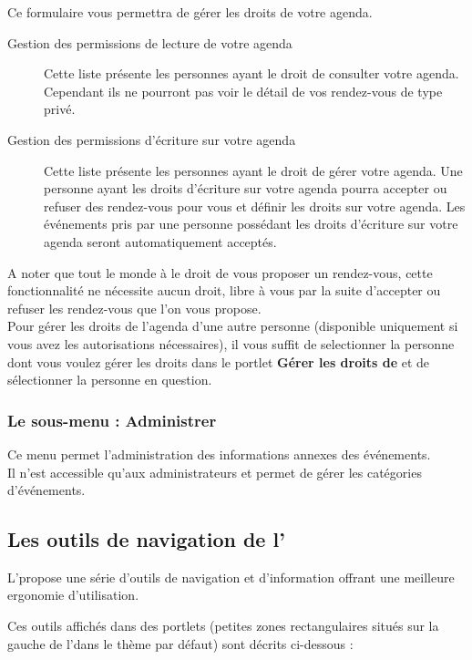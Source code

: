 Ce formulaire vous permettra de gérer les droits de votre agenda.
\begin{description}
\item[Gestion des permissions de lecture de votre agenda] Cette liste présente
les personnes ayant le droit de consulter votre agenda. Cependant ils ne
pourront pas voir le détail de vos rendez-vous de type privé.
\item[Gestion des permissions d'écriture sur votre agenda] Cette liste présente
les personnes ayant le droit de gérer votre agenda. Une personne ayant les
droits d'écriture sur votre agenda pourra accepter ou refuser des rendez-vous pour
vous et définir les droits sur votre agenda.
Les événements pris par une personne possédant les droits d'écriture sur votre agenda
seront automatiquement acceptés.
\end{description}

A noter que tout le monde à le droit de vous proposer un rendez-vous, cette
fonctionnalité ne nécessite aucun droit, libre à vous par la suite d'accepter ou
refuser les rendez-vous que l'on vous propose.\\

Pour gérer les droits de l'agenda d'une autre personne (disponible uniquement si
vous avez les autorisations nécessaires), il vous suffit de selectionner la
personne dont vous voulez gérer les droits dans le portlet \textbf{Gérer les droits
de} et de sélectionner la personne en question.

\subsubsection{Le sous-menu : Administrer}

Ce menu permet l'administration des informations annexes des événements.\\

Il n'est accessible qu'aux administrateurs et permet de gérer les catégories d'événements.

\subsection{Les outils de navigation de l'\agenda}

L'\agenda propose une série d'outils de navigation et d'information offrant une meilleure ergonomie d'utilisation.

Ces outils affichés dans des portlets (petites zones rectangulaires situés sur la gauche de l'\agenda dans le thème par défaut) sont décrits ci-dessous :

